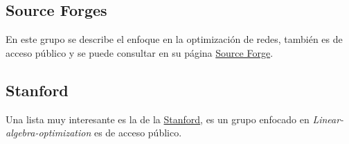 \documentclass{report}
\begin{document}
\subsection*{Source Forges}
En este grupo se describe el enfoque en la optimización de redes, también es de acceso público y se puede consultar en su página \href{https://sourceforge.net/projects/opennop/lists/opennop-devel}{Source Forge}.

\subsection*{Stanford}
Una lista muy interesante es la de la \href{https://mailman.stanford.edu/mailman/listinfo/icme-linear-algebra-optimization}{Stanford}, es un grupo enfocado en \textit{Linear-algebra-optimization} es de acceso público.
\end{document}
